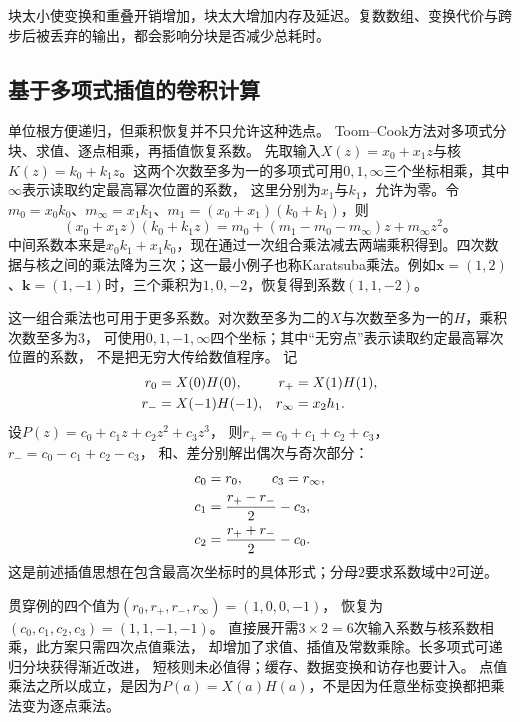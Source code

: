 块太小使变换和重叠开销增加，块太大增加内存及延迟。复数数组、变换代价与跨步后被丢弃的输出，都会影响分块是否减少总耗时。

\subsection{基于多项式插值的卷积计算}\label{sec:signal-analysis-fast-toom}\label{sec:cnn-toom-cook}

单位根方便递归，但乘积恢复并不只允许这种选点。
Toom--Cook方法对多项式分块、求值、逐点相乘，再插值恢复系数。
先取输入$X(z)=x_0+x_1z$与核$K(z)=k_0+k_1z$。这两个次数至多为一的多项式可用$0,1,\infty$三个坐标相乘，其中$\infty$表示读取约定最高幂次位置的系数，
这里分别为$x_1$与$k_1$，允许为零。令$m_0=x_0k_0$、$m_\infty=x_1k_1$、$m_1=(x_0+x_1)(k_0+k_1)$，则
\begin{equation}
  (x_0+x_1z)(k_0+k_1z)
  =m_0+(m_1-m_0-m_\infty)z+m_\infty z^2\text{。}
  \label{eq:cnn-toom-example}
\end{equation}
中间系数本来是$x_0k_1+x_1k_0$，现在通过一次组合乘法减去两端乘积得到。四次数据与核之间的乘法降为三次；这一最小例子也称Karatsuba乘法。例如$\bm x=(1,2)$、$\bm k=(1,-1)$时，三个乘积为$1,0,-2$，恢复得到系数$(1,1,-2)$。


这一组合乘法也可用于更多系数。对次数至多为二的$X$与次数至多为一的$H$，乘积次数至多为$3$，
可使用$0,1,-1,\infty$四个坐标；其中“无穷点”表示读取约定最高幂次位置的系数，
不是把无穷大传给数值程序。
记
\begin{align}
  r_0&=X(0)H(0),&r_+&=X(1)H(1),\notag\\
  r_-&=X(-1)H(-1),&r_\infty&=x_2h_1.\label{eq:cnn-toom-three-two-evaluation}
\end{align}
设$P(z)=c_0+c_1z+c_2z^2+c_3z^3$，
则$r_+=c_0+c_1+c_2+c_3$，$r_-=c_0-c_1+c_2-c_3$，
和、差分别解出偶次与奇次部分：
\begin{align}
  c_0&=r_0,\qquad c_3=r_\infty,\notag\\
  c_1&=\frac{r_+-r_-}{2}-c_3,\notag\\
  c_2&=\frac{r_++r_-}{2}-c_0.
  \label{eq:signal-analysis-toom-reconstruction}
\end{align}
\BookEquationAliases{\label{eq:cnn-toom-three-two-recovery}}
这是前述插值思想在包含最高次坐标时的具体形式；分母$2$要求系数域中$2$可逆。

贯穿例的四个值为$(r_0,r_+,r_-,r_\infty)=(1,0,0,-1)$，
恢复为$(c_0,c_1,c_2,c_3)=(1,1,-1,-1)$。
直接展开需$3\times2=6$次输入系数与核系数相乘，此方案只需四次点值乘法，
却增加了求值、插值及常数乘除。长多项式可递归分块获得渐近改进，
短核则未必值得；缓存、数据变换和访存也要计入。
点值乘法之所以成立，是因为$P(a)=X(a)H(a)$，不是因为任意坐标变换都把乘法变为逐点乘法。

